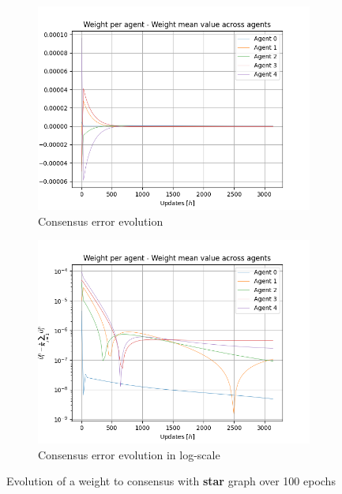 \documentclass[a4paper,11pt,oneside]{book}
\begin{document}
\begin{figure}[h]
\centering
	\begin{subfigure}{0.49\textwidth}	
	\includegraphics[width=\textwidth]{star/weight_100}
	\caption{Consensus error evolution}
	\end{subfigure}
\hfill
	\begin{subfigure}{0.49\textwidth}	
	\includegraphics[width=\textwidth]{star/weight_100_log}
	\caption{Consensus error evolution in log-scale}
	\end{subfigure}
\caption{Evolution of a weight to consensus with \textbf{star} graph over 100 epochs}
\label{star_test}
\end{figure}
\end{document}
